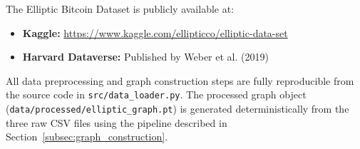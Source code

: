 The Elliptic Bitcoin Dataset is publicly available at:
\begin{itemize}
    \item \textbf{Kaggle:} \url{https://www.kaggle.com/ellipticco/elliptic-data-set}
    \item \textbf{Harvard Dataverse:} Published by Weber et al. (2019)~\cite{weber2019anti}
\end{itemize}

All data preprocessing and graph construction steps are fully reproducible from the source code in \texttt{src/data\_loader.py}. The processed graph object (\texttt{data/\allowbreak processed/\allowbreak elliptic\_graph.pt}) is generated deterministically from the three raw CSV files using the pipeline described in Section~\ref{subsec:graph_construction}.
